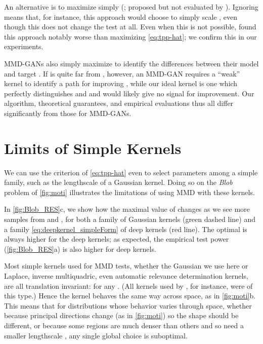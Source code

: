 \documentclass{article}
\begin{document}
An alternative is to maximize simply 
(\citealt{sriperumbudur2009choice}; proposed but not evaluated by \citeauthor{Matthias:deep-test}).
Ignoring  means that,
for instance, this approach would choose to simply scale ,
even though this does not change the test at all.
Even when this is not possible,
\citet{sutherland:mmd-opt} found this approach notably worse than maximizing \eqref{eq:tpp-hat};
we confirm this in our experiments.


MMD-GANs \citep{Li2017,MMD_GAN}
also simply maximize 
to identify the differences between their model  and target .
If  is quite far from , however,
an MMD-GAN requires a ``weak'' kernel to identify a path for improving  \citep{MMD_GAN2},
while our ideal kernel is one which perfectly distinguishes  and  and would likely give no signal for improvement.
Our algorithm, theoretical guarantees, and empirical evaluations thus all differ significantly from those for MMD-GANs.


\section{Limits of Simple Kernels}
\label{sec:MMD_limited}

We can use the criterion  of \eqref{eq:tpp-hat}
even to select parameters among a simple family,
such as the lengthscale of a Gaussian kernel.
Doing so on the \emph{Blob} problem of \cref{fig:moti}
illustrates the limitations of using MMD with these kernels.

In \cref{fig:Blob_RES}c,
we show how the maximal value of 
changes as we see more samples from  and ,
for both a family of Gaussian kernels (green dashed line)
and a family \eqref{eq:deepkernel_simpleForm} of deep kernels (red line).
The optimal  is always higher for the deep kernels;
as expected, the empirical test power (\cref{fig:Blob_RES}a) is also higher for deep kernels.

Most simple kernels used for MMD tests,
whether the Gaussian we use here or Laplace, inverse multiquadric,
even automatic relevance determination kernels,
are all translation invariant:
 for any .
(All kernels used by \citet{sutherland:mmd-opt}, for instance, were of this type.)
Hence the kernel behaves the same way across space,
as in \cref{fig:moti}b.
This means that for distributions whose behavior varies through space,
whether because principal directions change (as in \cref{fig:moti}) so the shape should be different,
or because some regions are much denser than others and so need a smaller lengthscale \citep[e.g.][Figures 1 and 2]{Kevin_ICML2019},
any single global choice is suboptimal.
\end{document}
